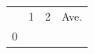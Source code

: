 {\begin{center}
\begin{xtabular*}{\mytablewidth}[t]{|p{10\mystarwidth}|p{10\mystarwidth}|p{10\mystarwidth}|p{10\mystarwidth}|}
    
         &
    
    
        1 &
    
    
        2 &
    
    
        Ave.%
     \tabularnewline{}
    
    
        0 &
    
    
         &
    
    
         &
    
    
     \tabularnewline{}
    
    

\end{xtabular*}
\end{center}}
